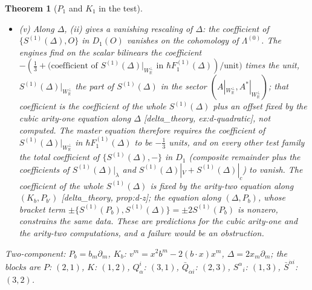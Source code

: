 \documentclass[11pt]{report}
\theoremstyle{plain}
\newtheorem{theorem}{Theorem}[chapter]
\theoremstyle{definition}
\numberwithin{equation}{chapter}
\newcommand{\Wp}{W_{\mathbb R}^\perp}
\begin{document}
\begin{theorem}[$P_1$ and $K_1$ in the test]
\begin{itemize}
\item (v) Along $\Delta$, (ii) gives a vanishing rescaling of $\Delta$: the coefficient of $\{S^{(1)}(\Delta),O\}$ in $D_1(O)$ vanishes on the cohomology of $\Lambda^{(0)}$. The engines find on the scalar bilinears the coefficient $-(\tfrac13+\text{(coefficient of }S^{(1)}(\Delta)|_{\Wp}\text{ in }\hbar F_1^{(1)}(\Delta))/\text{unit})$ times the unit, $S^{(1)}(\Delta)|_{\Wp}$ the part of $S^{(1)}(\Delta)$ in the sector $(A|_{\Wp},A^*|_{\Wp})$; that coefficient is the coefficient of the whole $S^{(1)}(\Delta)$ plus an offset fixed by the cubic arity-one equation along $\Delta$ [delta\_theory, ex:d-quadratic], not computed. The master equation therefore requires the coefficient of $S^{(1)}(\Delta)|_{\Wp}$ in $\hbar F_1^{(1)}(\Delta)$ to be $-\tfrac13$ units, and on every other test family the total coefficient of $\{S^{(1)}(\Delta),-\}$ in $D_1$ (composite remainder plus the coefficients of $S^{(1)}(\Delta)|_\lambda$ and $S^{(1)}(\Delta)|_V+S^{(1)}(\Delta)|_c$) to vanish. The coefficient of the whole $S^{(1)}(\Delta)$ is fixed by the arity-two equation along $(K_b,P_{b'})$ [delta\_theory, prop:d-z]; the equation along $(\Delta,P_b)$, whose bracket term $\pm\{S^{(1)}(P_b),S^{(1)}(\Delta)\}=\pm2S^{(1)}(P_b)$ is nonzero, constrains the same data. These are predictions for the cubic arity-one and the arity-two computations, and a failure would be an obstruction.
\end{itemize}
Two-component: $P_b=b_m\partial_m$, $K_b$: $v^m=x^2b^m-2(b\cdot x)x^m$, $\Delta=2x_m\partial_m$; the blocks are $P$: $(2,1)$, $K$: $(1,2)$, $Q^i_\alpha$: $(3,1)$, $\bar Q_{\dot\alpha i}$: $(2,3)$, $S^\alpha{}_i$: $(1,3)$, $\bar S^{\dot\alpha i}$: $(3,2)$.
\end{theorem}
\end{document}
